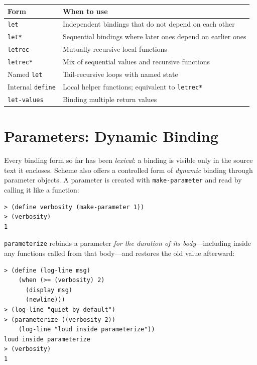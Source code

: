 \begin{center}
\begin{tabular}{lp{8cm}}
\textbf{Form} & \textbf{When to use} \\
\hline
\texttt{let} & Independent bindings that do not depend on each other \\
\texttt{let*} & Sequential bindings where later ones depend on earlier ones \\
\texttt{letrec} & Mutually recursive local functions \\
\texttt{letrec*} & Mix of sequential values and recursive functions \\
Named \texttt{let} & Tail-recursive loops with named state \\
Internal \texttt{define} & Local helper functions; equivalent to \texttt{letrec*} \\
\texttt{let-values} & Binding multiple return values \\
\end{tabular}
\end{center}

\section{Parameters: Dynamic Binding}

Every binding form so far has been \emph{lexical}: a binding is visible only in the source text it encloses. Scheme also offers a controlled form of \emph{dynamic} binding through parameter objects. A parameter is created with \texttt{make-parameter} and read by calling it like a function:

\begin{lstlisting}[style=repl]
> (define verbosity (make-parameter 1))
> (verbosity)
1
\end{lstlisting}

\texttt{parameterize} rebinds a parameter \emph{for the duration of its body}---including inside any functions called from that body---and restores the old value afterward:

\begin{lstlisting}[style=repl]
> (define (log-line msg)
    (when (>= (verbosity) 2)
      (display msg)
      (newline)))
> (log-line "quiet by default")
> (parameterize ((verbosity 2))
    (log-line "loud inside parameterize"))
loud inside parameterize
> (verbosity)
1
\end{lstlisting}


